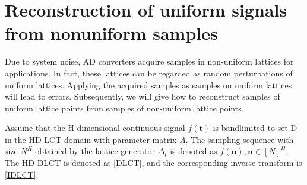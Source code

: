 \documentclass[journal]{IEEEtran}
\begin{document}
\section{Reconstruction of uniform signals from nonuniform samples}
Due to system noise, AD converters acquire samples in non-uniform lattices for applications. In fact, these lattices can be regarded as random perturbations of uniform lattices. Applying the acquired samples as samples on uniform lattices will lead to errors. Subsequently, we will give how to reconstruct samples of uniform lattice points from samples of non-uniform lattice points.

Assume that the H-dimensional continuous signal $ f(\boldsymbol t) $ is bandlimited to set D in the HD LCT domain with parameter matrix $ A $. The sampling sequence with size $N^H$ obtained by the lattice generator $\Delta _t$ is denoted as $f(\boldsymbol n), \boldsymbol n \in {[N]^H}  $. The HD DLCT is denoted as \eqref{DLCT}, and the corresponding inverse transform is \eqref{IDLCT}. 
\end{document}
